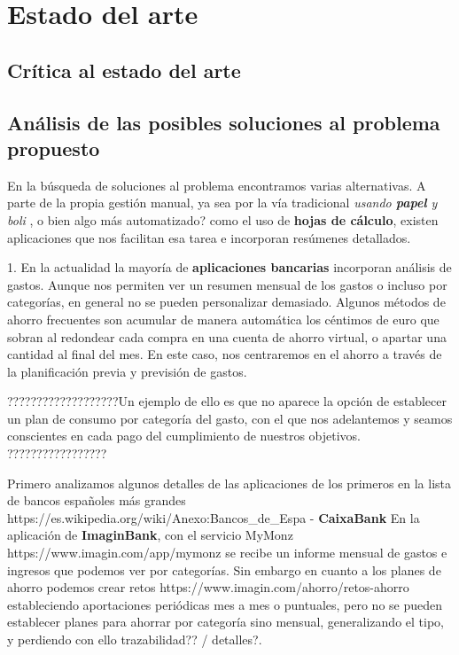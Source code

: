 \chapter{Estado del arte}
\section{Crítica al estado del arte}

\section{Análisis de las posibles soluciones al problema propuesto}
En la búsqueda de soluciones al problema encontramos varias alternativas. A parte 
de la propia gestión manual, ya sea por la vía tradicional \textit{usando \textbf{papel} y boli} , 
o bien algo más automatizado? como el uso de \textbf{hojas de cálculo}, existen aplicaciones 
que nos facilitan esa tarea e incorporan resúmenes detallados. 

1. En la actualidad la mayoría de \textbf{aplicaciones bancarias} incorporan análisis de gastos. 
Aunque nos permiten ver un resumen mensual de los gastos o incluso por categorías, en 
general no se pueden personalizar demasiado. Algunos métodos de ahorro frecuentes son acumular 
de manera automática los céntimos de euro que sobran al redondear cada compra en una cuenta 
de ahorro virtual, o apartar una cantidad al final del mes. En este caso, nos centraremos 
en el ahorro a través de la planificación previa y previsión de gastos.

???????????????????Un ejemplo de ello es que no aparece la 
opción de establecer un plan de consumo por categoría del gasto, con el que nos adelantemos y 
seamos conscientes en cada pago del cumplimiento de nuestros objetivos.
?????????????????

Primero analizamos algunos detalles de las aplicaciones de los primeros en la lista 
de bancos españoles más grandes https://es.wikipedia.org/wiki/Anexo:Bancos_de_Espa%
- \textbf{CaixaBank} En la aplicación de \textbf{ImaginBank}, con el servicio MyMonz https://www.imagin.com/app/mymonz 
se recibe un informe mensual de gastos e ingresos que podemos ver por categorías. 
Sin embargo en cuanto a los planes de ahorro podemos crear retos https://www.imagin.com/ahorro/retos-ahorro 
estableciendo aportaciones periódicas mes a mes o puntuales, pero no se pueden 
establecer planes para ahorrar por categoría sino mensual, generalizando el tipo, y 
perdiendo con ello trazabilidad?? / detalles?.

